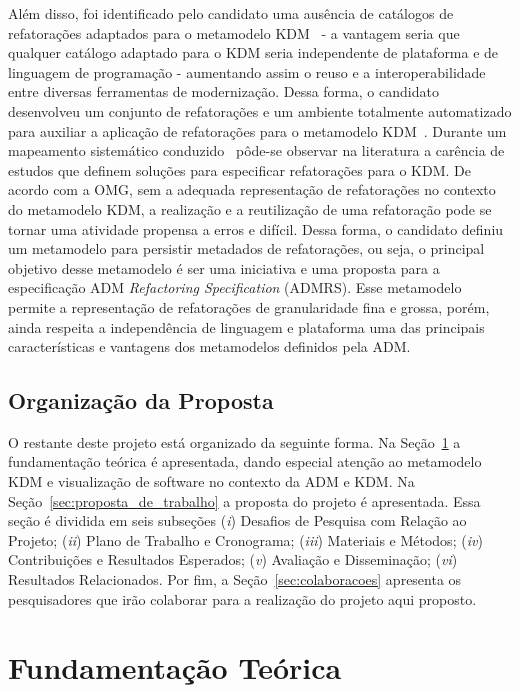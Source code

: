 \documentclass[12pt]{article}
\begin{document}
Além disso, foi identificado pelo candidato uma ausência de catálogos de refatorações adaptados para o metamodelo KDM~\cite{durelli_systematic_mapping} - a vantagem seria que qualquer catálogo adaptado para o KDM seria independente de plataforma e de linguagem de programação - aumentando assim o reuso e a interoperabilidade entre diversas ferramentas de modernização. Dessa forma, o candidato desenvolveu um conjunto de refatorações e um ambiente totalmente automatizado para auxiliar a aplicação de refatorações para o metamodelo KDM~\cite{durelli_catalogo, durelli_VEM_ferramenta}. Durante um mapeamento sistemático conduzido~\cite{durelli_systematic_mapping} pôde-se observar na literatura a carência de estudos que definem soluções para especificar refatorações para o KDM. De acordo com a OMG, sem a adequada representação de refatorações no contexto do metamodelo KDM, a realização e a reutilização de uma refatoração pode se tornar uma atividade propensa a erros e difícil. Dessa forma, o candidato definiu um metamodelo para persistir metadados de refatorações, ou seja, o principal objetivo desse metamodelo é ser uma iniciativa e uma proposta para a especificação ADM \textit{Refactoring Specification} (ADMRS). Esse metamodelo permite a representação de refatorações de granularidade fina e grossa, porém, ainda respeita a independência de linguagem e plataforma uma das principais características e vantagens dos metamodelos definidos pela ADM. 

\subsection{Organização da Proposta}

O restante deste projeto está organizado da seguinte forma. Na Seção~\ref{sec:fundamentacao_teorica} a fundamentação teórica é apresentada, dando especial atenção ao metamodelo KDM e visualização de software no contexto da ADM e KDM. Na Seção~\ref{sec:proposta_de_trabalho} a proposta do projeto é apresentada. Essa seção é dividida em seis subseções (\textit{i}) Desafios de Pesquisa com Relação ao Projeto; (\textit{ii}) Plano de Trabalho e Cronograma; (\textit{iii}) Materiais e Métodos; (\textit{iv}) Contribuições e Resultados Esperados; (\textit{v}) Avaliação e Disseminação; (\textit{vi}) Resultados Relacionados. Por fim, a Seção~\ref{sec:colaboracoes} apresenta os pesquisadores que irão colaborar para a realização do projeto aqui proposto.

\section{Fundamentação Teórica}\label{sec:fundamentacao_teorica}
\end{document}

